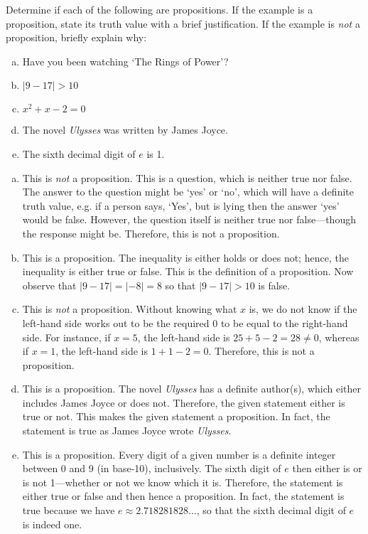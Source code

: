 \documentclass[11pt,letterpaper]{article}
\begin{document}

 Determine if each of the following are propositions. If the example is a proposition, state its truth value with a brief justification. If the example is \textit{not} a proposition, briefly explain why:
	\begin{enumerate}[(a)]
	\item Have you been watching `The Rings of Power'?
	\item $|9 - 17| > 10$
	\item $x^2 + x - 2= 0$
	\item The novel \textit{Ulysses} was written by James Joyce. 
	\item The sixth decimal digit of $e$ is 1.
	\end{enumerate} \pspace

\sol 
\begin{enumerate}[(a)]
\item This is \textit{not} a proposition. This is a question, which is neither true nor false. The answer to the question might be `yes' or `no', which will have a definite truth value, e.g. if a person says, `Yes', but is lying then the answer `yes' would be false. However, the question itself is neither true nor false---though the response might be. Therefore, this is not a proposition. \pspace

\item This is a proposition. The inequality is either holds or does not; hence, the inequality is either true or false. This is the definition of a proposition. Now observe that $|9 - 17|= |-8|= 8$ so that $|9 - 17| > 10$ is false. \pspace

\item This is \textit{not} a proposition. Without knowing what $x$ is, we do not know if the left-hand side works out to be the required 0 to be equal to the right-hand side. For instance, if $x= 5$, the left-hand side is $25 + 5 - 2= 28 \neq 0$, whereas if $x= 1$, the left-hand side is $1 + 1 - 2= 0$. Therefore, this is not a proposition. \pspace

\item This is a proposition. The novel \textit{Ulysses} has a definite author(s), which either includes James Joyce or does not. Therefore, the given statement either is true or not. This makes the given statement a proposition. In fact, the statement is true as James Joyce wrote \textit{Ulysses}. \pspace

\item This is a proposition. Every digit of a given number is a definite integer between 0 and 9 (in base-10), inclusively. The sixth digit of $e$ then either is or is not 1---whether or not we know which it is. Therefore, the statement is either true or false and then hence a proposition. In fact, the statement is true because we have $e \approx 2.718281828\ldots$, so that the sixth decimal digit of $e$ is indeed one.
\end{enumerate}
\end{document}
